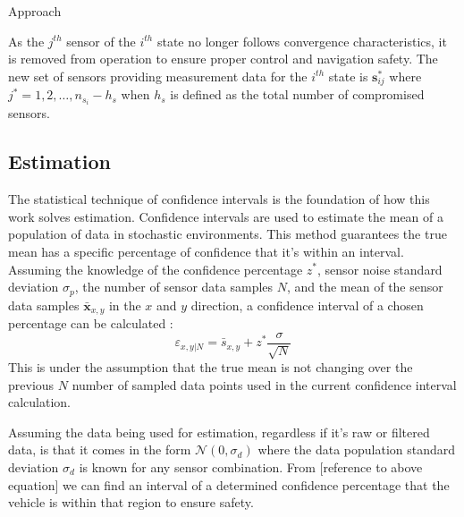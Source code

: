 \begin{section}{Approach}

As the $j^{th}$ sensor of the $i^{th}$ state no longer follows convergence characteristics, it is removed from operation to ensure proper control and navigation safety. The new set of sensors providing measurement data for the $i^{th}$ state is $\bm{s}_{ij}^*$ where $j^*=1,2,\dots,n_{s_i}-h_s$  when $h_s$ is defined as the total number of compromised sensors.

\subsection{Estimation}

 The statistical technique of confidence intervals is the foundation of how this work solves estimation. Confidence intervals are used to estimate the mean of a population of data in stochastic environments.  This method guarantees the true mean has a specific percentage of confidence that it's within an interval. Assuming the knowledge of the confidence percentage $z^{*}$, sensor noise standard deviation $ \sigma_p $, the number of sensor data samples $N$, and the mean of the sensor data samples $ \bm{\bar{x}}_{x,y} $ in the $x$ and $y$ direction, a confidence interval of a chosen percentage can be calculated : 
 	\begin{equation}
		\varepsilon_{x,y|N} = \bar{s}_{x,y} + z^{*}\frac{\sigma}{\sqrt{N}}
	\end{equation}
This is under the assumption that the true mean is not changing over the previous $N$ number of sampled data points used in the current confidence interval calculation.

Assuming the data being used for estimation, regardless if it's raw or filtered data, is that it comes in the form $\mathcal{N}(0,\sigma_d)$ where the data population standard deviation $\sigma_d$ is known for any sensor combination. From [reference to above equation] we can find an interval of a determined confidence percentage that the vehicle is within that region to ensure safety. 


\end{section}
